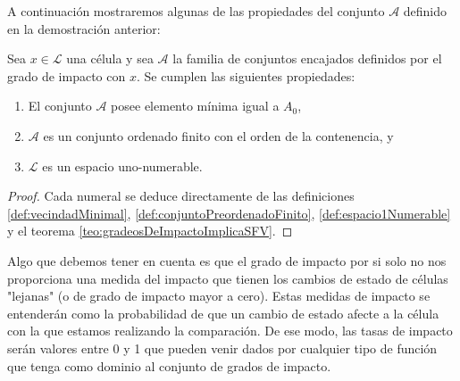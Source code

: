 A continuación mostraremos algunas de las propiedades del conjunto $\mathcal{A}$ definido en la demostración anterior:

\begin{proposicion}\label{pro:propiedadesSistemasDeVecindadesEncajadas}
Sea $x\in\mathcal{L}$ una célula y sea $\mathcal{A}$ la familia de conjuntos encajados definidos por el grado de impacto con $x$. Se cumplen las siguientes propiedades:
\begin{enumerate}
    \item El conjunto $\mathcal{A}$ posee elemento mínima igual a $A_0$,
    \item $\mathcal{A}$ es un conjunto ordenado finito con el orden de la contenencia, y
    \item $\mathcal{L}$ es un espacio uno-numerable.
\end{enumerate}
\end{proposicion}
\begin{proof}
Cada numeral se deduce directamente de las definiciones \ref{def:vecindadMinimal}, \ref{def:conjuntoPreordenadoFinito}, \ref{def:espacio1Numerable} y el teorema \ref{teo:gradeosDeImpactoImplicaSFV}.
\end{proof}

Algo que debemos tener en cuenta es que el grado de impacto por si solo no nos proporciona una medida del impacto que tienen los cambios de estado de células "lejanas" (o de grado de impacto mayor a cero). Estas medidas de impacto se entenderán como la probabilidad de que un cambio de estado afecte a la célula con la que estamos realizando la comparación. De ese modo, las tasas de impacto serán valores entre 0 y 1 que pueden venir dados por cualquier tipo de función que tenga como dominio al conjunto de grados de impacto.

